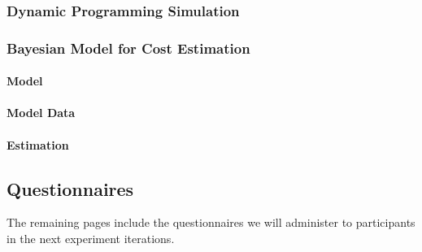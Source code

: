 \hypertarget{dynamic-programming-simulation-1}{%
\subsubsection{Dynamic Programming
Simulation}\label{dynamic-programming-simulation-1}}

\hypertarget{bayesian-model-for-cost-estimation-1}{%
\subsubsection{Bayesian Model for Cost
Estimation}\label{bayesian-model-for-cost-estimation-1}}

\hypertarget{model-1}{%
\paragraph{Model}\label{model-1}}

\hypertarget{model-data}{%
\paragraph{Model Data}\label{model-data}}

\hypertarget{estimation-1}{%
\paragraph{Estimation}\label{estimation-1}}

\hypertarget{questionnaires}{%
\subsection{Questionnaires}\label{questionnaires}}

The remaining pages include the questionnaires we will administer to
participants in the next experiment iterations.
